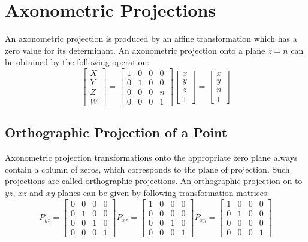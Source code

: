 \documentclass[12pt]{article}
\begin{document}
\section{Axonometric Projections}

An axonometric projection is produced by an affine transformation which has a zero value for its determinant. An axonometric projection onto a plane $ z = n $ can be obtained by the following operation: 
\begin{equation}
	\begin{bmatrix} X \\ Y \\ Z \\ W \end{bmatrix} = 
	\begin{bmatrix}
		1 & 0 & 0 & 0 \\
		0 & 1 & 0 & 0 \\
		0 & 0 & 0 & n \\
		0 & 0 & 0 & 1 
	\end{bmatrix} 
	\begin{bmatrix}
	x \\ y \\ z \\ 1
	\end{bmatrix} = 
	\begin{bmatrix}
	x \\ y \\ n \\ 1
	\end{bmatrix}
\end{equation}

\subsection{Orthographic Projection of a Point}
	
	Axonometric projection transformations onto the appropriate zero plane always contain a column of zeros, which corresponds to the plane of projection. Such projections are called orthographic projections. An orthographic projection on to $yz$, $xz$ and $xy$ planes can be given by following transformation matrices:
	\begin{equation} \label{orthographic_std}
	    	P_{yz} = \begin{bmatrix}
	0 & 0 & 0 & 0 \\
	0 & 1 & 0 & 0 \\
	0 & 0 & 1 & 0 \\
	0 & 0 & 0 & 1  
	\end{bmatrix}
	P_{xz} = \begin{bmatrix}
	1 & 0 & 0 & 0 \\
	0 & 0 & 0 & 0 \\
	0 & 0 & 1 & 0 \\
	0 & 0 & 0 & 1  
	\end{bmatrix}
	P_{xy} = \begin{bmatrix}
	1 & 0 & 0 & 0 \\
	0 & 1 & 0 & 0 \\
	0 & 0 & 0 & 0 \\
	0 & 0 & 0 & 1  
	\end{bmatrix}
	\end{equation}
\end{document}
